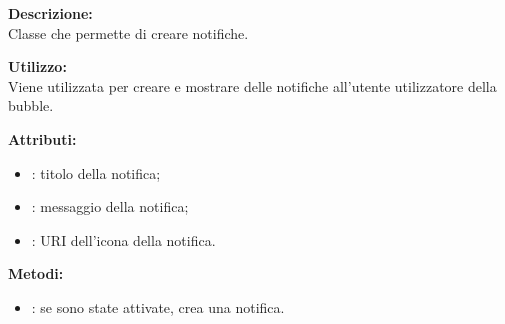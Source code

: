 \textbf{Descrizione:}\\
Classe che permette di creare notifiche.

\textbf{Utilizzo:}\\
Viene utilizzata per creare e mostrare delle notifiche all'utente utilizzatore della bubble.



\textbf{Attributi:}
\begin{itemize}
	\item {}: titolo della notifica;
	\item {}: messaggio della notifica;
	\item {}: URI dell'icona della notifica.
\end{itemize}

\textbf{Metodi:}
\begin{itemize}
	\item {}: se sono state attivate, crea una notifica.
\end{itemize}

\subparagraph{\class}\mbox{}\\ \label{\class}



